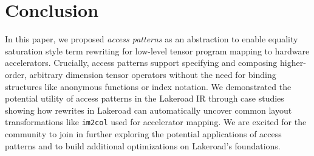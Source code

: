 \documentclass[prologue, dvipsnames, sigplan, screen, review, anonymous]{acmart}
\newcommand{\g}{Lakeroad\xspace}
\newcommand{\tcd}[1]{\texttt{#1}}
\begin{document}

    
\section{Conclusion}
\label{sec:conclusion}

In this paper,
  we proposed \textit{access patterns} as an
  abstraction to enable equality saturation
  style term rewriting for low-level
  tensor program mapping to hardware accelerators.
Crucially, access patterns support
  specifying and composing
  higher-order, arbitrary dimension
  tensor operators without the need
  for binding structures like anonymous functions
  or index notation.
We demonstrated the potential utility of
  access patterns in the \g IR through
  case studies showing how rewrites in \g
  can automatically uncover common
  layout transformations like \tcd{im2col}
  used for accelerator mapping.
We are excited for the community
  to join in further exploring the potential
  applications of access patterns and to
  build additional optimizations on
  \g's foundations.





\end{document}
